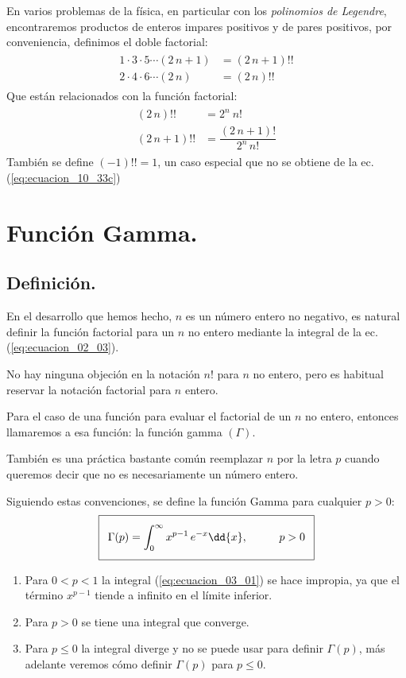 En varios problemas de la física, en particular con los \emph{polinomios de Legendre}, encontraremos productos de enteros impares positivos y de pares positivos, por conveniencia, definimos el doble factorial:
\begin{align}
\begin{aligned}
1 \cdot 3 \cdot 5 \cdots (2 \, n+1) &= (2 \, n+1) !! \\
2 \cdot 4 \cdot 6 \cdots (2 \, n) &= (2 \, n) !!
\end{aligned}
\label{eq:ecuacion_10_33b}
\end{align}
Que están relacionados con la función factorial:
\begin{align}
\begin{aligned}
(2 \, n)!! &=  2^{n} \: n! \\[1em]
(2 \, n+1)!! &= \dfrac{(2 \, n+1)!}{2^{n} \, n!}
\end{aligned}
\label{eq:ecuacion_10_33c}
\end{align}
También se define $(-1)!! = 1$, un caso especial que no se obtiene de la ec. (\ref{eq:ecuacion_10_33c})

\section{Función Gamma.}

\subsection{Definición.}

En el desarrollo que hemos hecho, $n$ es un número entero no negativo, es natural definir la función factorial para un $n$ no entero mediante la integral de la ec.(\ref{eq:ecuacion_02_03}).
\par
No hay ninguna objeción en la notación $n!$ para $n$ no entero, pero es habitual reservar la notación factorial para $n$ entero.
\par
Para el caso de una función para evaluar el factorial de un $n$ no entero, entonces llamaremos a esa función: la función gamma $(\Gamma)$.
\par
También es una práctica bastante común reemplazar $n$ por la letra $p$ cuando queremos decir que no es necesariamente un número entero.
\par
Siguiendo estas convenciones, se define la función Gamma para cualquier $p > 0$:
\begin{align}\addtolength{\fboxsep}{5pt}\boxed{
\Gamma (p) = \int_{0}^{\infty} x^{p-1} \, e^{-x} \dd{x}, \hspace{1cm} p > 0}
\label{eq:ecuacion_03_01}
\end{align}
\begin{enumerate}
\item Para $0 < p < 1$ la integral (\ref{eq:ecuacion_03_01}) se hace impropia, ya que el término $x^{p-1}$ tiende a infinito en el límite inferior.
\item Para $p > 0$ se tiene una integral que converge.
\item Para $p \leq 0$ la integral diverge y no se puede usar para definir $\Gamma (p)$, más adelante veremos cómo definir  $\Gamma (p)$ para $p \leq 0$.
\end{enumerate}

